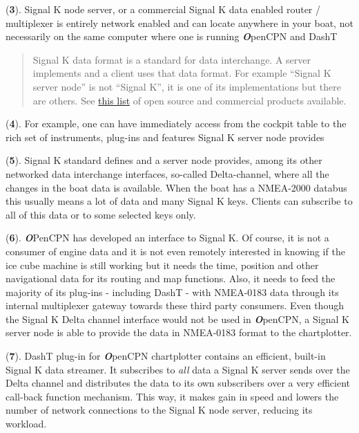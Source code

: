 \documentclass[11pt]{article}
\begin{document}
    (\textbf{3}). Signal K node server, or a commercial Signal K data
enabled router / multiplexer is entirely network enabled and can locate
anywhere in your boat, not necessarily on the same computer where one is
running \textbf{\emph{O}}penCPN and DashT

    \begin{quote}
Signal K data format is a standard for data interchange. A server
implements and a client uses that data format. For example ``Signal K
server node'' is not ``Signal K'', it is one of its implementations but
there are others. See
\href{https://opencpn.org/wiki/dokuwiki/doku.php?id=opencpn:supplementary_software:signalk:a2}{this
list} of open source and commercial products available.
\end{quote}

    (\textbf{4}). For example, one can have immediately access from the
cockpit table to the rich set of instruments, plug-ins and features
Signal K server node provides

    (\textbf{5}). Signal K standard defines and a server node provides,
among its other networked data interchange interfaces, so-called
Delta-channel, where all the changes in the boat data is available. When
the boat has a NMEA-2000 databus this usually means a lot of data and
many Signal K keys. Clients can subscribe to all of this data or to some
selected keys only.

    (\textbf{6}). \textbf{\emph{O}}PenCPN has developed an interface to
Signal K. Of course, it is not a consumer of engine data and it is not
even remotely interested in knowing if the ice cube machine is still
working but it needs the time, position and other navigational data for
its routing and map functions. Also, it needs to feed the majority of
its plug-ins - including DashT - with NMEA-0183 data through its
internal multiplexer gateway towards these third party consumers. Even
though the Signal K Delta channel interface would not be used in
\textbf{\emph{O}}penCPN, a Signal K server node is able to provide the
data in NMEA-0183 format to the chartplotter.

    (\textbf{7}). DashT plug-in for \textbf{\emph{O}}penCPN chartplotter
contains an efficient, built-in Signal K data streamer. It subscribes to
\emph{all} data a Signal K server sends over the Delta channel and
distributes the data to its own subscribers over a very efficient
call-back function mechanism. This way, it makes gain in speed and
lowers the number of network connections to the Signal K node server,
reducing its workload.
\end{document}
